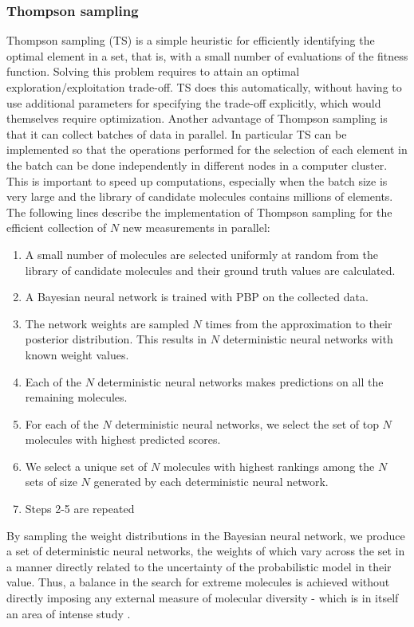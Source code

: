 \subsubsection{Thompson sampling}

Thompson sampling (TS) \cite{Thompson_1933} is a simple heuristic for efficiently identifying the optimal element in a set, that is, with a small number of evaluations of the fitness function. Solving this problem requires to attain an optimal exploration/exploitation trade-off. TS does this automatically, without having to use additional parameters for specifying the trade-off explicitly, which would themselves require optimization. Another advantage of Thompson sampling is that it can collect batches of data in parallel. In particular TS can be implemented so that the operations performed for the selection of each element in the batch can be done independently in different nodes in a computer cluster. This is important to speed up computations, especially when the batch size is very large and the library of candidate molecules contains millions of elements. The following lines describe the implementation of Thompson sampling for the efficient collection of $N$ new measurements in parallel:
\begin{enumerate}
\item A small number of molecules are selected uniformly at random from the library of candidate molecules and their ground truth values are calculated.
\item A Bayesian neural network is trained with PBP on the collected data.
\item The network weights are sampled $N$ times from the approximation to their posterior distribution. This results in $N$ deterministic neural networks with known weight values.
\item Each of the $N$ deterministic neural networks makes predictions on all the remaining molecules.
\item For each of the $N$ deterministic neural networks, we select the set of top $N$ molecules with highest predicted scores.
\item We select a unique set of $N$ molecules with highest rankings among the $N$ sets of size $N$ generated by each deterministic neural network.
\item Steps 2-5 are repeated
\end{enumerate}
By sampling the weight distributions in the Bayesian neural network, we produce a set of deterministic neural networks, the weights of which vary across the set in a manner directly related to the uncertainty of the probabilistic model in their value.  Thus, a balance in the search for extreme molecules is achieved without directly imposing any external measure of molecular diversity - which is in itself an area of intense study \cite{Maldonado_2006}.